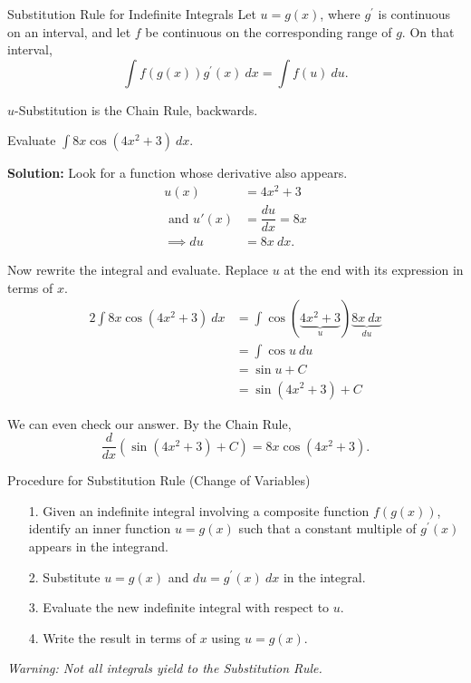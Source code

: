 \documentclass[14pt]{beamer}
\newcommand{\dint}{\displaystyle\int}
\begin{document}
\begin{frame}{\small Substitution Rule for Indefinite Integrals}
\small
Let $u=g(x)$, where $g^{\prime}$ is continuous on an interval, and let $f$ be continuous on the corresponding range of $g$.  On that interval,
\[\dint f(g(x)) g^{\prime}(x)\ dx = \dint f(u)\ du.\]

\vspace{1pc}
\alert{$u$-Substitution is the Chain Rule, backwards.}
\end{frame}

\begin{frame}{}
\small
\begin{ex} Evaluate $\dint 8x \cos(4x^2 + 3)\ dx.$ \end{ex}

\vspace{1pc}
{\bf Solution:} Look for a function whose derivative also appears.
\begin{align*}
u(x) &=4x^2+3 \\
\text{ and }u'(x) &= \dfrac{du}{dx} = 8x \\[0.5pc]
\implies du &= 8x\ dx.
\end{align*}
\end{frame}

\begin{frame}{}
\footnotesize
Now rewrite the integral and evaluate.  Replace $u$ at the end with its expression in terms of $x$. 
\begin{alignat*}{2}
\dint 8x \cos(4x^2 + 3)\ dx &= \dint \cos(\underbrace{4x^2 + 3}_{u})\underbrace{8x\ dx}_{du} \\
&= \dint \cos u\ du \\[0.25pc]
&= \sin u + C \\[0.5pc]
&= \sin(4x^2 + 3) + C
\end{alignat*}

We can even check our answer.  By the Chain Rule,
\[\dfrac{d}{dx}\left(\sin{(4x^2+3)}+C\right)=8x\cos{(4x^2+3)}.\]
\end{frame}

\begin{frame}{\small Procedure for Substitution Rule (Change of Variables)}
\small
\begin{itemize}
\item[1.] Given an indefinite integral involving a composite function $f(g(x))$, identify an inner function $u=g(x)$ such that a constant multiple of $g^{\prime}(x)$ appears in the integrand.
\item[2.] Substitute $u=g(x)$ and $du=g^{\prime}(x)\ dx$ in the integral.
\item[3.] Evaluate the new indefinite integral with respect to $u$.
\item[4.] Write the result in terms of $x$ using $u=g(x)$.
\end{itemize}

\vspace{1pc}
{\it Warning:  Not all integrals yield to the Substitution Rule.}
\end{frame}
\end{document}
